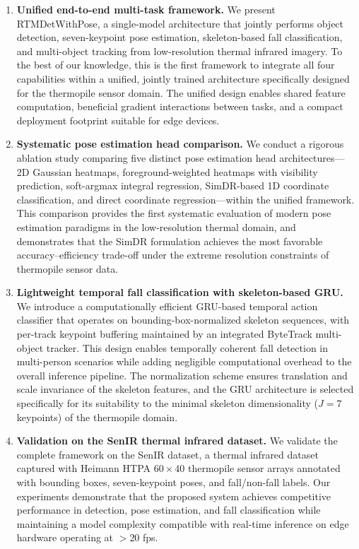 \begin{enumerate}
    \item \textbf{Unified end-to-end multi-task framework.} We present RTMDetWithPose, a single-model architecture that jointly performs object detection, seven-keypoint pose estimation, skeleton-based fall classification, and multi-object tracking from low-resolution thermal infrared imagery. To the best of our knowledge, this is the first framework to integrate all four capabilities within a unified, jointly trained architecture specifically designed for the thermopile sensor domain. The unified design enables shared feature computation, beneficial gradient interactions between tasks, and a compact deployment footprint suitable for edge devices.

    \item \textbf{Systematic pose estimation head comparison.} We conduct a rigorous ablation study comparing five distinct pose estimation head architectures---2D Gaussian heatmaps, foreground-weighted heatmaps with visibility prediction, soft-argmax integral regression, SimDR-based 1D coordinate classification, and direct coordinate regression---within the unified framework. This comparison provides the first systematic evaluation of modern pose estimation paradigms in the low-resolution thermal domain, and demonstrates that the SimDR formulation achieves the most favorable accuracy--efficiency trade-off under the extreme resolution constraints of thermopile sensor data.

    \item \textbf{Lightweight temporal fall classification with skeleton-based GRU.} We introduce a computationally efficient GRU-based temporal action classifier that operates on bounding-box-normalized skeleton sequences, with per-track keypoint buffering maintained by an integrated ByteTrack multi-object tracker. This design enables temporally coherent fall detection in multi-person scenarios while adding negligible computational overhead to the overall inference pipeline. The normalization scheme ensures translation and scale invariance of the skeleton features, and the GRU architecture is selected specifically for its suitability to the minimal skeleton dimensionality ($J=7$ keypoints) of the thermopile domain.

    \item \textbf{Validation on the SenIR thermal infrared dataset.} We validate the complete framework on the SenIR dataset, a thermal infrared dataset captured with Heimann HTPA $60 \times 40$ thermopile sensor arrays annotated with bounding boxes, seven-keypoint poses, and fall/non-fall labels. Our experiments demonstrate that the proposed system achieves competitive performance in detection, pose estimation, and fall classification while maintaining a model complexity compatible with real-time inference on edge hardware operating at $>$20 fps.
\end{enumerate}


